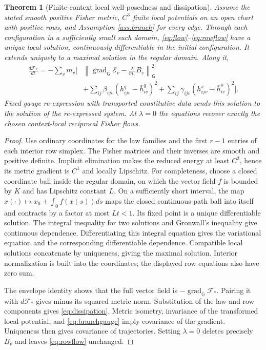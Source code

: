 \documentclass[11pt]{article}
\newtheorem{theorem}{Theorem}[section]
\DeclareMathOperator{\grad}{grad}
\newcommand{\G}{\mathsf G}
\begin{document}
\begin{theorem}[Finite-context local well-posedness and dissipation]
Assume the stated smooth positive Fisher metric, $C^3$ finite local potentials on an open chart with positive rows, and Assumption \ref{ass:branch} for every edge. Through each configuration in a sufficiently small such domain, \eqref{eq:flow}--\eqref{eq:rowflow} have a unique local solution, continuously differentiable in the initial configuration. It extends uniquely to a maximal solution in the regular domain. Along it,
\begin{align}
 \frac{d\mathcal F_*}{dt}
 =-\sum_v m_v\bigg[
  &\left\|\grad_{\G}\mathcal E_v-\frac{\lambda}{m_v}B_v\right\|_{\G}^2\nonumber\\
  &+\sum_{ij}\beta_{ijv}(h^q_{ijv}-\bar h^q_{iv})^2
   +\sum_{ij}\gamma_{ijv}(h^s_{ijv}-\bar h^s_{iv})^2\bigg].
 \label{eq:dissipation}
\end{align}
Fixed gauge re-expression with transported constitutive data sends this solution to the solution of the re-expressed system. At $\lambda=0$ the equations recover exactly the chosen context-local reciprocal Fisher flows.
\label{thm:ode}
\end{theorem}
\begin{proof}
Use ordinary coordinates for the law families and the first $r-1$ entries of each interior row simplex. The Fisher matrices and their inverses are smooth and positive definite. Implicit elimination makes the reduced energy at least $C^2$, hence its metric gradient is $C^1$ and locally Lipschitz. For completeness, choose a closed coordinate ball inside the regular domain, on which the vector field $f$ is bounded by $K$ and has Lipschitz constant $L$. On a sufficiently short interval, the map
$x(\cdot)\mapsto x_0+\int_0^{\cdot}f(x(s))ds$
maps the closed continuous-path ball into itself and contracts by a factor at most $Lt<1$. Its fixed point is a unique differentiable solution. The integral inequality for two solutions and Gronwall's inequality give continuous dependence. Differentiating this integral equation gives the variational equation and the corresponding differentiable dependence. Compatible local solutions concatenate by uniqueness, giving the maximal solution. Interior normalization is built into the coordinates; the displayed row equations also have zero sum.

The envelope identity shows that the full vector field is $-\grad_{\mathbb G}\mathcal F_*$. Pairing it with $d\mathcal F_*$ gives minus its squared metric norm. Substitution of the law and row components gives \eqref{eq:dissipation}. Metric isometry, invariance of the transformed local potential, and \eqref{eq:branchgauge} imply covariance of the gradient. Uniqueness then gives covariance of trajectories. Setting $\lambda=0$ deletes precisely $B_v$ and leaves \eqref{eq:rowflow} unchanged.
\end{proof}
\end{document}
